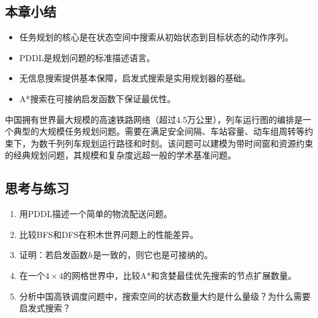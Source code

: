\subsection*{本章小结}
\begin{itemize}
  \item 任务规划的核心是在状态空间中搜索从初始状态到目标状态的动作序列。
  \item PDDL是规划问题的标准描述语言。
  \item 无信息搜索提供基本保障，启发式搜索是实用规划器的基础。
  \item A*搜索在可接纳启发函数下保证最优性。
\end{itemize}

\begin{appbox}[title={\textbf{应用：中国高铁调度任务规划}}]
中国拥有世界最大规模的高速铁路网络（超过4.5万公里），列车运行图的编排是一个典型的大规模任务规划问题。需要在满足安全间隔、车站容量、动车组周转等约束下，为数千列列车规划运行路径和时刻。该问题可以建模为带时间窗和资源约束的经典规划问题，其规模和复杂度远超一般的学术基准问题。
\end{appbox}

\subsection*{思考与练习}
\begin{enumerate}
  \item 用PDDL描述一个简单的物流配送问题。
  \item 比较BFS和DFS在积木世界问题上的性能差异。
  \item 证明：若启发函数$h$是一致的，则它也是可接纳的。
  \item 在一个$4 \times 4$的网格世界中，比较A*和贪婪最佳优先搜索的节点扩展数量。
  \item 分析中国高铁调度问题中，搜索空间的状态数量大约是什么量级？为什么需要启发式搜索？
\end{enumerate}
